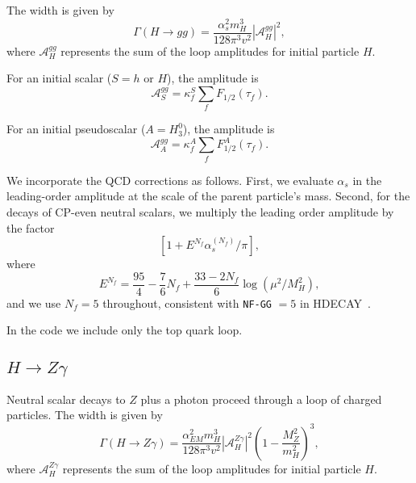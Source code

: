 \documentclass[11pt]{article}
\begin{document}
The width is given by~\cite{HHG}
\begin{equation}
	\Gamma(H \to gg) = \frac{\alpha_s^2 m_H^3}{128 \pi^3 v^2} |\mathcal{A}_H^{gg}|^2,
\end{equation}
where $\mathcal{A}_H^{gg}$ represents the sum of the loop amplitudes for initial particle $H$.

For an initial scalar ($S = h$ or $H$), the amplitude is
\begin{equation}
	\mathcal{A}_S^{gg} = \kappa_f^S \sum_f F_{1/2}(\tau_f).
\end{equation}

For an initial pseudoscalar ($A = H_3^0$), the amplitude is
\begin{equation}
	\mathcal{A}_A^{gg} = \kappa_f^A \sum_f F_{1/2}^A(\tau_f).
\end{equation}

We incorporate the QCD corrections as follows.  First, we evaluate $\alpha_s$ in the leading-order amplitude at the scale of the parent particle's mass.  Second, for the decays of CP-even neutral scalars, we multiply the leading order amplitude by the factor~\cite{Djouadi:1995gt}
\begin{equation}
	\left[ 1 + E^{N_f} \alpha_s^{(N_f)}/\pi \right],
\end{equation}
where
\begin{equation}
	E^{N_f} = \frac{95}{4} - \frac{7}{6} N_f + \frac{33 - 2N_f}{6} \log(\mu^2/M_H^2),
\end{equation}
and we use $N_f = 5$ throughout, consistent with {\tt NF-GG} $= 5$ in HDECAY~\cite{Djouadi:1997yw}.

In the code we include only the top quark loop.

\subsection{$H \to Z \gamma$}

Neutral scalar decays to $Z$ plus a photon proceed through a loop of charged particles.  The width is given by~\cite{HHG}
\begin{equation}
	\Gamma(H \to Z \gamma) = \frac{\alpha_{EM}^2 m_H^3}{128 \pi^3 v^2}
	| \mathcal{A}_H^{Z\gamma} |^2 \left( 1 - \frac{M_Z^2}{m_H^2} \right)^3,
\end{equation}
where $\mathcal{A}_H^{Z\gamma}$ represents the sum of the loop amplitudes for initial particle $H$.
\end{document}
